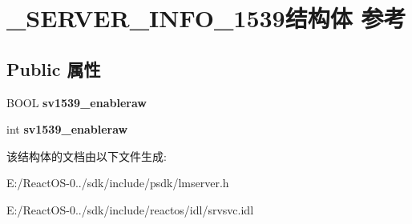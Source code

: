 \hypertarget{struct___s_e_r_v_e_r___i_n_f_o__1539}{}\section{\+\_\+\+S\+E\+R\+V\+E\+R\+\_\+\+I\+N\+F\+O\+\_\+1539结构体 参考}
\label{struct___s_e_r_v_e_r___i_n_f_o__1539}
\subsection*{Public 属性}
\begin{DoxyCompactItemize}
\item 
\mbox{\label{struct___s_e_r_v_e_r___i_n_f_o__1539_abea7176bf4c7bdd0886b0034790f24ed}} 
B\+O\+OL {\bfseries sv1539\+\_\+enableraw}
\item 
\mbox{\label{struct___s_e_r_v_e_r___i_n_f_o__1539_a063763b8e73ea3257c68a9d40bb3aea2}} 
int {\bfseries sv1539\+\_\+enableraw}
\end{DoxyCompactItemize}


该结构体的文档由以下文件生成\+:\begin{DoxyCompactItemize}
\item 
E\+:/\+React\+O\+S-\/0../sdk/include/psdk/lmserver.\+h\item 
E\+:/\+React\+O\+S-\/0../sdk/include/reactos/idl/srvsvc.\+idl\end{DoxyCompactItemize}
